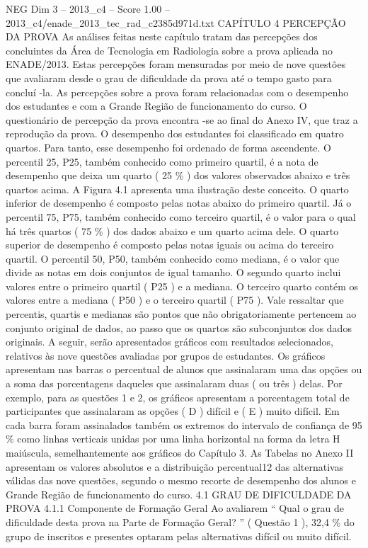 \begin{textsample}{NEG Dim 3 – 2013\_c4 – Score 1.00 – 2013\_c4/enade\_2013\_tec\_rad\_c2385d971d.txt}  \label{ex:f3_neg_144}
CAPÍTULO 4 PERCEPÇÃO DA PROVA As análises feitas neste capítulo tratam das percepções dos concluintes da Área de Tecnologia em Radiologia sobre a prova aplicada no ENADE/2013.
Estas percepções foram mensuradas por meio de nove questões que avaliaram desde o grau de dificuldade da prova até o tempo gasto para concluí -la.
As percepções sobre a prova foram relacionadas com o desempenho dos estudantes e com a Grande Região de funcionamento do curso.
O questionário de percepção da prova encontra -se ao final do Anexo IV, que traz a reprodução da prova.
O desempenho dos estudantes foi classificado em quatro quartos.
Para tanto, esse desempenho foi ordenado de forma ascendente.
O percentil 25, P25, também conhecido como primeiro quartil, é a nota de desempenho que deixa um quarto ( 25 \% ) dos valores observados abaixo e três quartos acima.
A Figura 4.1 apresenta uma ilustração deste conceito.
O quarto inferior de desempenho é composto pelas notas abaixo do primeiro quartil.
Já o percentil 75, P75, também conhecido como terceiro quartil, é o valor para o qual há três quartos ( 75 \% ) dos dados abaixo e um quarto acima dele.
O quarto superior de desempenho é composto pelas notas iguais ou acima do terceiro quartil.
O percentil 50, P50, também conhecido como mediana, é o valor que divide as notas em dois conjuntos de igual tamanho.
O segundo quarto inclui valores entre o primeiro quartil ( P25 ) e a mediana.
O terceiro quarto contém os valores entre a mediana ( P50 ) e o terceiro quartil ( P75 ).
Vale ressaltar que percentis, quartis e medianas são pontos que não obrigatoriamente pertencem ao conjunto original de dados, ao passo que os quartos são subconjuntos dos dados originais.
A seguir, serão apresentados gráficos com resultados selecionados, relativos às nove questões avaliadas por grupos de estudantes.
Os gráficos apresentam nas barras o percentual de alunos que assinalaram uma das opções ou a soma das porcentagens daqueles que assinalaram duas ( ou três ) delas.
Por exemplo, para as questões 1 e 2, os gráficos apresentam a porcentagem total de participantes que assinalaram as opções ( D ) difícil e ( E ) muito difícil.
Em cada barra foram assinalados também os extremos do intervalo de confiança de 95 \% como linhas verticais unidas por uma linha horizontal na forma da letra H maiúscula, semelhantemente aos gráficos do Capítulo 3.
As Tabelas no Anexo II apresentam os valores absolutos e a distribuição percentual12 das alternativas válidas das nove questões, segundo o mesmo recorte de desempenho dos alunos e Grande Região de funcionamento do curso. 4.1 GRAU DE DIFICULDADE DA PROVA 4.1.1 Componente de Formação Geral Ao avaliarem “ Qual o grau de dificuldade desta prova na Parte de Formação Geral? ” ( Questão 1 ), 32,4 \% do grupo de inscritos e presentes optaram pelas alternativas difícil ou muito difícil.

\end{textsample}

